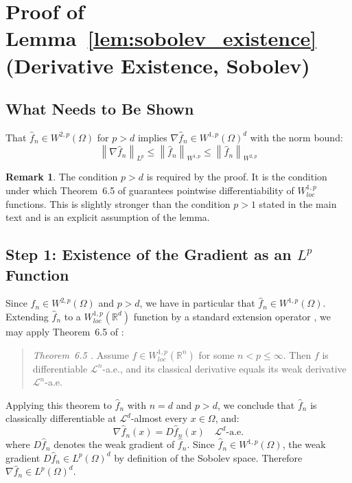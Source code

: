 \documentclass[12pt,a4paper]{article}
\numberwithin{equation}{section}
\theoremstyle{plain}
\theoremstyle{definition}
\newtheorem{remark}{Remark}
\newcommand{\norm}[1]{\left\| #1 \right\|}
\newcommand{\R}{\mathbb{R}}
\newcommand{\fn}{\hat{f}_n}
\begin{document}
	\section{Proof of Lemma~\ref{lem:sobolev_existence}
		(Derivative Existence, Sobolev)}
	\label{app:lem_sobolev_existence}
	
	\subsection{What Needs to Be Shown}
	
	That $\fn \in W^{2,p}(\Omega)$ for $p > d$ implies $\nabla \fn \in
	W^{1,p}(\Omega)^d$ with the norm bound:
	\begin{equation}
		\norm{\nabla \fn}_{L^p}
		\leq \norm{\fn}_{W^{1,p}}
		\leq \norm{\fn}_{W^{2,p}}
	\end{equation}
	
	\begin{remark}
		The condition $p > d$ is required by the proof. It is the condition under
		which Theorem~6.5 of \citet{evans2015measure} guarantees pointwise
		differentiability of $W^{1,p}_{loc}$ functions. This is slightly stronger
		than the condition $p > 1$ stated in the main text and is an explicit
		assumption of the lemma.
	\end{remark}
	
	\subsection{Step 1: Existence of the Gradient as an $L^p$ Function}
	
	Since $\fn \in W^{2,p}(\Omega)$ and $p > d$, we have in particular that
	$\fn \in W^{1,p}(\Omega)$. Extending $\fn$ to a $W^{1,p}_{loc}(\R^d)$
	function by a standard extension operator \citep[Section~4.4]{evans2015measure},
	we may apply Theorem~6.5 of \citet{evans2015measure}:
	
	\begin{quote}
		\textit{Theorem~6.5 \citep{evans2015measure}.}
		Assume $f \in W^{1,p}_{loc}(\R^n)$ for some $n < p \leq \infty$. Then $f$
		is differentiable $\mathcal{L}^n$-a.e., and its classical derivative equals
		its weak derivative $\mathcal{L}^n$-a.e.
	\end{quote}
	
	Applying this theorem to $\fn$ with $n = d$ and $p > d$, we conclude that
	$\fn$ is classically differentiable at $\mathcal{L}^d$-almost every $x \in
	\Omega$, and:
	\begin{equation}
		\nabla \fn(x) = D\fn(x) \quad \mathcal{L}^d\text{-a.e.}
	\end{equation}
	where $D\fn$ denotes the weak gradient of $\fn$. Since $\fn \in W^{1,p}(\Omega)$,
	the weak gradient $D\fn \in L^p(\Omega)^d$ by definition of the Sobolev space.
	Therefore $\nabla \fn \in L^p(\Omega)^d$.
	
\end{document}
